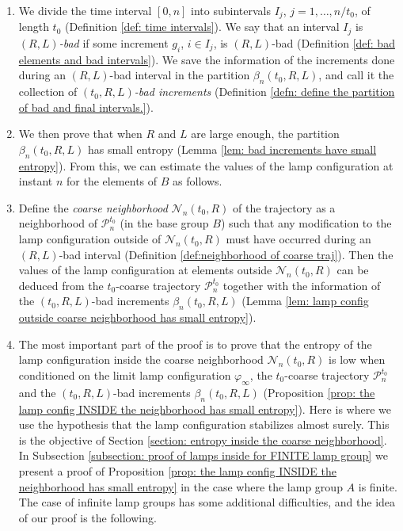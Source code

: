\documentclass[reqno,oneside,11pt]{amsart}
\theoremstyle{plain}
\theoremstyle{definition}
\begin{document}
\begin{enumerate}
	\item \label{step: step 4} We divide the time interval $[0,n]$ into subintervals $I_j$, $j=1,\ldots, n/t_0$, of length $t_0$ (Definition \ref{def: time intervals}). We say that an interval $I_j$ is \emph{$(R,L)$-bad} if some increment $g_i$, $i\in I_j$, is $(R,L)$-bad (Definition \ref{def: bad elements and bad intervals}). We save the information of the increments done during an $(R,L)$-bad interval in the partition $\beta_n(t_0,R,L)$, and call it the collection of \emph{$(t_0,R,L)$-bad increments} (Definition \ref{defn: define the partition of bad and final intervals.}).
	
	\item \label{step: step 5} We then prove that when $R$ and $L$ are large enough, the partition $\beta_n(t_0,R,L)$ has small entropy (Lemma \ref{lem: bad increments have small entropy}). From this, we can estimate the values of the lamp configuration at instant $n$ for the elements of $B$ as follows.
	
	\item \label{step: step 6} Define the \emph{coarse neighborhood} $\mathcal{N}_n(t_0,R)$ of the trajectory as a neighborhood of $\mathcal{P}_n^{t_0}$ (in the base group $B$) such that any modification to the lamp configuration outside of $\mathcal{N}_n(t_0,R)$ must have occurred during an $(R,L)$-bad interval (Definition \ref{def:neighborhood of coarse traj}). Then the values of the lamp configuration at elements outside $\mathcal{N}_n(t_0,R)$ can be deduced from the $t_0$-coarse trajectory $\mathcal{P}_n^{t_0}$ together with the information of the $(t_0,R,L)$-bad increments $\beta_n(t_0,R,L)$ (Lemma \ref{lem: lamp config outside coarse neighborhood has small entropy}).
	
	\item \label{step: step 7} The most important part of the proof is to prove that the entropy of the lamp configuration inside the coarse neighborhood  $\mathcal{N}_n(t_0,R)$ is low when conditioned on the limit lamp configuration $\varphi_{\infty}$, the $t_0$-coarse trajectory $\mathcal{P}_n^{t_0}$ and the $(t_0,R,L)$-bad increments $\beta_n(t_0,R,L)$ (Proposition \ref{prop: the lamp config INSIDE the neighborhood has small entropy}). Here is where we use the hypothesis that the lamp configuration stabilizes almost surely. This is the objective of Section \ref{section: entropy inside the coarse neighborhood}. In Subsection \ref{subsection: proof of lamps inside for FINITE lamp group} we present a proof of Proposition \ref{prop: the lamp config INSIDE the neighborhood has small entropy} in the case where the lamp group $A$ is finite. The case of infinite lamp groups has some additional difficulties, and the idea of our proof is the following.
	

\end{enumerate}
\end{document}
